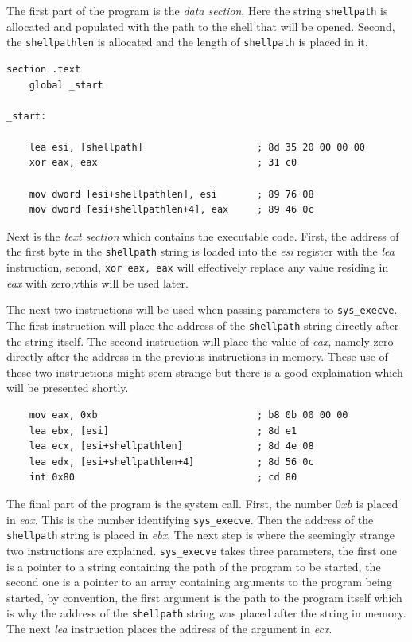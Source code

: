 \documentclass[11pt,twoside]{eitExjobb}
\begin{document}
\noindent The first part of the program is the \emph{data section}. Here the string \texttt{shellpath} is allocated and populated with the path to the shell that will be opened. Second, the \texttt{shellpathlen} is allocated and the length of \texttt{shellpath} is placed in it. 

\begin{verbatim}
section .text
    global _start

_start:

    lea esi, [shellpath]                    ; 8d 35 20 00 00 00
    xor eax, eax                            ; 31 c0

    mov dword [esi+shellpathlen], esi       ; 89 76 08
    mov dword [esi+shellpathlen+4], eax     ; 89 46 0c

\end{verbatim}

\noindent Next is the \emph{text section} which contains the executable code. First, the address of the first byte in the \texttt{shellpath} string is loaded into the \emph{esi} register with the \emph{lea} instruction, second, \texttt{xor eax, eax} will effectively replace any value residing in \emph{eax} with zero,vthis will be used later. 

The next two instructions will be used when passing parameters to \texttt{sys\_execve}. The first instruction will place the address of the \texttt{shellpath} string directly after the string itself. The second instruction will place the value of \emph{eax}, namely zero directly after the address in the previous instructions in memory. These use of these two instructions might seem strange but there is a good explaination which will be presented shortly.

\begin{verbatim}
    mov eax, 0xb                            ; b8 0b 00 00 00
    lea ebx, [esi]                          ; 8d e1
    lea ecx, [esi+shellpathlen]             ; 8d 4e 08
    lea edx, [esi+shellpathlen+4]           ; 8d 56 0c
    int 0x80                                ; cd 80
\end{verbatim}

\noindent The final part of the program is the system call. First, the number $0xb$ is placed in \emph{eax}. This is the number identifying \texttt{sys\_execve}. Then the address of the \texttt{shellpath} string is placed in \emph{ebx}. The next step is where the seemingly strange two instructions are explained. \texttt{sys\_execve} takes three parameters, the first one is a pointer to a string containing the path of the program to be started, the second one is a pointer to an array containing arguments to the program being started, by convention, the first argument is the path to the program itself which is why the address of the \texttt{shellpath} string was placed after the string in memory. The next \emph{lea} instruction places the address of the argument in \emph{ecx}. 
\end{document}
